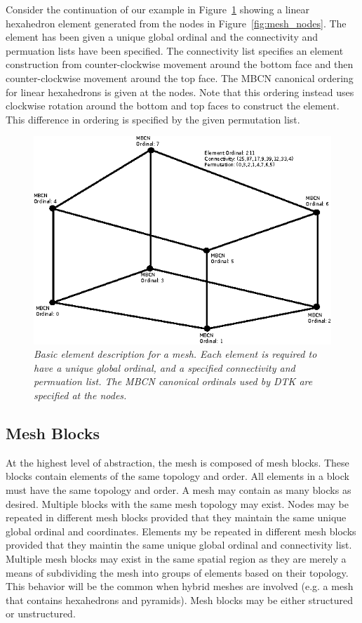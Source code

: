 \documentclass[letterpaper,12pt]{article}
\begin{document}
Consider the continuation of our example in
Figure~\ref{fig:mesh_element} showing a linear hexahedron element
generated from the nodes in Figure~\ref{fig:mesh_nodes}. The element
has been given a unique global ordinal and the connectivity and
permuation lists have been specified. The connectivity list specifies
an element construction from counter-clockwise movement around the
bottom face and then counter-clockwise movement around the top
face. The MBCN canonical ordering for linear hexahedrons is given at
the nodes. Note that this ordering instead uses clockwise rotation
around the bottom and top faces to construct the element. This
difference in ordering is specified by the given permutation list.

\begin{figure}[htpb!]
  \centering
  \includegraphics[width=5in]{hex_element.eps}
  \caption{\sl Basic element description for a mesh. Each element is
    required to have a unique global ordinal, and a specified
    connectivity and permuation list. The MBCN canonical ordinals used
    by DTK are specified at the nodes.}
  \label{fig:mesh_element}
\end{figure}

\subsection{Mesh Blocks}\label{subsec:blocks}
At the highest level of abstraction, the mesh is composed of mesh
blocks. These blocks contain elements of the same topology and
order. All elements in a block must have the same topology and
order. A mesh may contain as many blocks as desired. Multiple blocks
with the same mesh topology may exist. Nodes may be repeated in
different mesh blocks provided that they maintain the same unique
global ordinal and coordinates. Elements my be repeated in different
mesh blocks provided that they maintin the same unique global ordinal
and connectivity list. Multiple mesh blocks may exist in the same
spatial region as they are merely a means of subdividing the mesh into
groups of elements based on their topology. This behavior will be the
common when hybrid meshes are involved (e.g. a mesh that contains
hexahedrons and pyramids). Mesh blocks may be either structured or
unstructured. 
\end{document}
